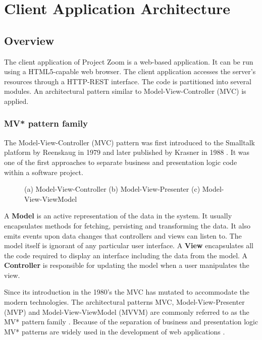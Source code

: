 \chapter{Client Application Architecture}

\section{Overview}
The client application of Project Zoom is a web-based application. It can be run using a HTML5-capable web browser. The client application accesses the server's resources through a HTTP-REST interface. The code is partitioned into several modules. An architectural pattern similar to Model-View-Controller (MVC) is applied.

\subsection{MV* pattern family}
The Model-View-Controller (MVC) pattern was first introduced to the Smalltalk platform by Reenskaug in 1979 \cite{Reenskaug_1979} and later published by Krasner in 1988 \cite{Krasner_1988}. It was one of the first approaches to separate business and presentation logic code within a software project.

\begin{figure}
\caption[Diagrams of Model-View-Controller, Model-View-Presenter and Model-View-ViewModel]{(a) Model-View-Controller \quad (b) Model-View-Presenter \quad (c) Model-View-ViewModel}
\label{fig:MV}
\end{figure}

A \textbf{Model} is an active representation of the data in the system. It usually encapsulates methods for fetching, persisting and transforming the data. It also emits events upon data changes that controllers and views can listen to. The model itself is ignorant of any particular user interface. A \textbf{View} encapsulates all the code required to display an interface including the data from the model. A \textbf{Controller} is responsible for updating the model when a user manipulates the view. \cite{Krasner_1988} \cite{Gamma_1994}

Since its introduction in the 1980's the MVC has mutated to accommodate the modern technologies. The architectural patterns MVC, Model-View-Presenter (MVP) and Model-View-ViewModel (MVVM) are commonly referred to as the MV* pattern family \cite{Osmani_2012}. Because of the separation of business and presentation logic MV* patterns are widely used in the development of web applications \cite{Takata_2012}.

